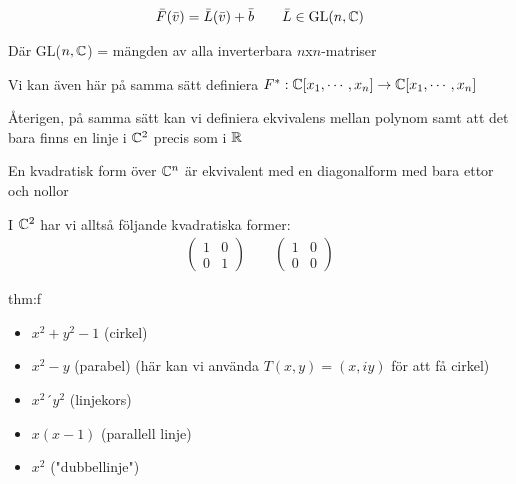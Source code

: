 \begin{equation*}
  \begin{gathered}
    \bar{F}(\bar{v}) = \bar{L}(\bar{v})+\bar{b}\qquad\bar{L}\in\text{GL}(n,\mathbb{C})
  \end{gathered}
\end{equation*}
\par\bigskip
\noindent Där GL($n,\mathbb{C}$) = mängden av alla inverterbara $n$x$n$-matriser
\par\bigskip
\noindent Vi kan även här på samma sätt definiera $F^*:\mathbb{C}[x_1,\cdots,x_n]\to\mathbb{C}[x_1,\cdots,x_n]$ 
\par\bigskip
\noindent Återigen, på samma sätt kan vi definiera ekvivalens mellan polynom samt att det bara finns en linje i $\mathbb{C}^2$ precis som i $\mathbb{R}$ 
\par\bigskip
\noindent En kvadratisk form över $\mathbb{C}^n$ är ekvivalent med en diagonalform med bara ettor och nollor\par
\noindent I $\mathbb{C}^2$ har vi alltså följande kvadratiska former:
\begin{equation*}
  \begin{gathered}
    \begin{pmatrix}1&0\\0&1\end{pmatrix}\qquad\begin{pmatrix}1&0\\0&0\end{pmatrix}
  \end{gathered}
\end{equation*}
\par\bigskip
\begin{theo}{thm:f}
  \begin{itemize}
    \item $x^2+y^2-1$ (cirkel)
    \item $x^2-y$ (parabel) (här kan vi använda $T(x,y) = (x,iy)$ för att få cirkel)
    \item $x^2´y^2$ (linjekors)
    \item $x(x-1)$ (parallell linje)
    \item $x^2$ ("dubbellinje")
  \end{itemize}
\end{theo}
